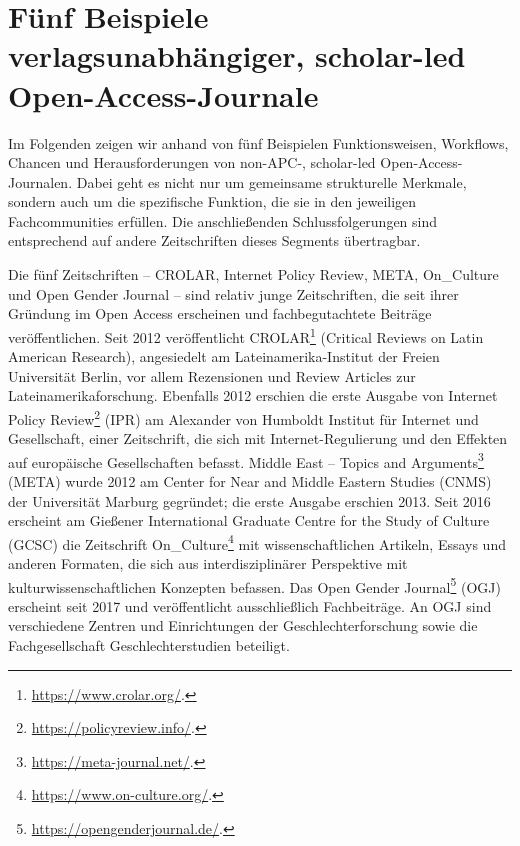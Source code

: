 \documentclass[a4paper,
fontsize=11pt,
oneside,
numbers=noperiodatend,
parskip=half-,
bibliography=totoc,
final
]{scrartcl}
\begin{document}
\hypertarget{fuxfcnf-beispiele-verlagsunabhuxe4ngiger-scholar-led-open-access-journale}{%
\section*{Fünf Beispiele verlagsunabhängiger, scholar-led
Open-Access-Journale}\label{fuxfcnf-beispiele-verlagsunabhuxe4ngiger-scholar-led-open-access-journale}}

Im Folgenden zeigen wir anhand von fünf Beispielen Funktionsweisen,
Workflows, Chancen und Herausforderungen von non-APC-, scholar-led
Open-Access-Journalen. Dabei geht es nicht nur um gemeinsame
strukturelle Merkmale, sondern auch um die spezifische Funktion, die sie
in den jeweiligen Fachcommunities erfüllen. Die anschließenden
Schlussfolgerungen sind entsprechend auf andere Zeitschriften dieses
Segments übertragbar.

Die fünf Zeitschriften -- CROLAR, Internet Policy Review, META,
On\_Culture und Open Gender Journal -- sind relativ junge Zeitschriften,
die seit ihrer Gründung im Open Access erscheinen und fachbegutachtete
Beiträge veröffentlichen. Seit 2012 veröffentlicht CROLAR\footnote{\url{https://www.crolar.org/}.}
(Critical Reviews on Latin American Research), angesiedelt am
Lateinamerika-Institut der Freien Universität Berlin, vor allem
Rezensionen und Review Articles zur Lateinamerikaforschung. Ebenfalls
2012 erschien die erste Ausgabe von Internet Policy Review\footnote{\url{https://policyreview.info/}.}
(IPR) am Alexander von Humboldt Institut für Internet und Gesellschaft,
einer Zeitschrift, die sich mit Internet-Regulierung und den Effekten
auf europäische Gesellschaften befasst. Middle East -- Topics and
Arguments\footnote{\url{https://meta-journal.net/}.} (META) wurde 2012
am Center for Near and Middle Eastern Studies (CNMS) der Universität
Marburg gegründet; die erste Ausgabe erschien 2013. Seit 2016 erscheint
am Gießener International Graduate Centre for the Study of Culture
(GCSC) die Zeitschrift On\_Culture\footnote{\url{https://www.on-culture.org/}.}
mit wissenschaftlichen Artikeln, Essays und anderen Formaten, die sich
aus interdisziplinärer Perspektive mit kulturwissenschaftlichen
Konzepten befassen. Das Open Gender Journal\footnote{\url{https://opengenderjournal.de/}.}
(OGJ) erscheint seit 2017 und veröffentlicht ausschließlich
Fachbeiträge. An OGJ sind verschiedene Zentren und Einrichtungen der
Geschlechterforschung sowie die Fachgesellschaft Geschlechterstudien
beteiligt.
\end{document}
